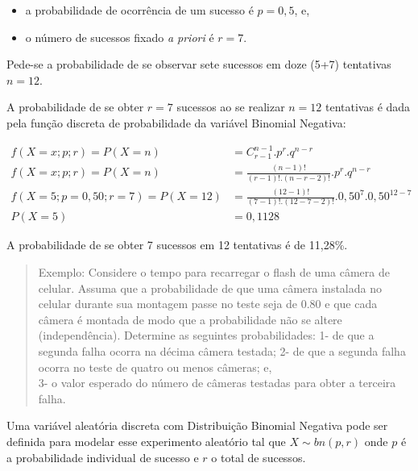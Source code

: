 \documentclass[
]{book}
\providecommand{\tightlist}{%
  \setlength{\itemsep}{0pt}\setlength{\parskip}{0pt}}
\begin{document}
\hfill\break

\begin{itemize}
\tightlist
\item
  a probabilidade de ocorrência de um sucesso é \(p=0,5\), e,\\
\item
  o número de sucessos fixado \emph{a priori} é \(r=7\).
\end{itemize}

\hfill\break

Pede-se a probabilidade de se observar sete sucessos em doze (5+7) tentativas \(n=12\).

\hfill\break

A probabilidade de se obter \(r=7\) sucessos ao se realizar \(n=12\) tentativas é dada pela função discreta de probabilidade da variável Binomial Negativa:

\begin{align*}
f(X=x; p; r) = P(X=n) & = {C}_{r-1}^{n-1} . {p}^{r}. {q}^{n-r} \\
f(X=x; p; r) = P(X=n) & = \frac{(n-1)!}{ (r-1)!. (n-r-2)!} . {p}^{r}. {q}^{n-r} \\
f(X=5; p=0,50 ; r=7) = P(X=12) & = \frac{(12-1)!}{ (7-1)!. (12-7-2)!} . {0,50}^{7}. {0,50}^{12-7} \\
P(X=5) & = 0,1128
\end{align*}

A probabilidade de se obter 7 sucessos em 12 tentativas é de 11,28\%.

\hfill\break

\begin{quote}
Exemplo: Considere o tempo para recarregar o flash de uma câmera de celular. Assuma que a probabilidade de que uma câmera instalada no celular durante sua montagem passe no teste seja de 0.80 e que cada câmera é montada de modo que a probabilidade não se altere (independência). Determine as seguintes probabilidades:
1- de que a segunda falha ocorra na décima câmera testada;
2- de que a segunda falha ocorra no teste de quatro ou menos câmeras; e,\\
3- o valor esperado do número de câmeras testadas para obter a terceira falha.
\end{quote}

\hfill\break

Uma variável aleatória discreta com Distribuição Binomial Negativa pode ser definida para modelar esse experimento aleatório tal que \(X\sim bn(p,r)\) onde \(p\) é a probabilidade individual de sucesso e \(r\) o total de sucessos.
\end{document}
